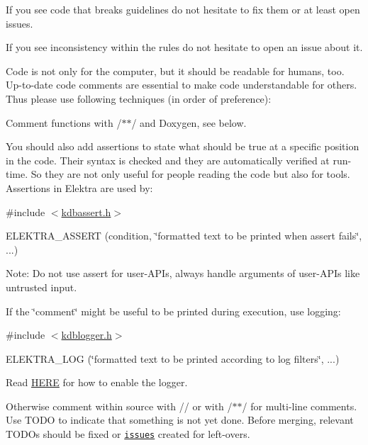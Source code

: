 If you see code that breaks guidelines do not hesitate to fix them or at least open issues.

If you see inconsistency within the rules do not hesitate to open an issue about it.

Code is not only for the computer, but it should be readable for humans, too. Up-\/to-\/date code comments are essential to make code understandable for others. Thus please use following techniques (in order of preference)\+:


\begin{DoxyEnumerate}
\item Comment functions with {\ttfamily /$\ast$$\ast$/} and Doxygen, see below.
\item You should also add assertions to state what should be true at a specific position in the code. Their syntax is checked and they are automatically verified at run-\/time. So they are not only useful for people reading the code but also for tools. Assertions in Elektra are used by\+:

{\ttfamily \#include $<$\hyperlink{kdbassert_8h}{kdbassert.\+h}$>$}

{\ttfamily E\+L\+E\+K\+T\+R\+A\+\_\+\+A\+S\+S\+E\+RT (condition, \char`\"{}formatted text to be printed when assert fails\char`\"{}, ...)}

Note\+: Do not use assert for user-\/\+A\+P\+Is, always handle arguments of user-\/\+A\+P\+Is like untrusted input.
\item If the \char`\"{}comment\char`\"{} might be useful to be printed during execution, use logging\+:

{\ttfamily \#include $<$\hyperlink{kdblogger_8h}{kdblogger.\+h}$>$}

{\ttfamily E\+L\+E\+K\+T\+R\+A\+\_\+\+L\+OG (\char`\"{}formatted text to be printed according to log filters\char`\"{}, ...)}

Read \hyperlink{doc_dev_logging_md}{H\+E\+RE} for how to enable the logger.
\item Otherwise comment within source with {\ttfamily //} or with {\ttfamily /$\ast$$\ast$/} for multi-\/line comments. Use {\ttfamily T\+O\+DO} to indicate that something is not yet done. Before merging, relevant {\ttfamily T\+O\+DO}s should be fixed or \href{https://issues.libelektra.org}{\tt issues} created for left-\/overs.
\end{DoxyEnumerate}


